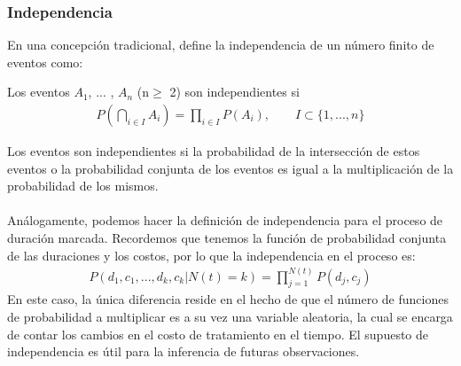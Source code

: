 \subsubsection{Independencia}
En una concepci\'on tradicional, \cite{resnickpath} define la independencia de un n\'umero finito de eventos como:\\
\begin{defi}
Los eventos $A_1$, ... , $A_n$ (n$\geq$ 2) son independientes si
\begin{align}
P(\bigcap_{i \in I} A_i) = \prod_{i \in I} P(A_i), \qquad I \subset\{1,...,n\} \nonumber
\end{align}
\end{defi}
Los eventos son independientes si la probabilidad de la intersecci\'on de estos eventos o la probabilidad conjunta de los eventos es igual a la multiplicaci\'on de la probabilidad de los mismos.\\
\\
An\'alogamente, podemos hacer la definici\'on de independencia para el proceso de duraci\'on marcada. Recordemos que tenemos la funci\'on de probabilidad conjunta de las duraciones y los costos, por lo que la independencia en el proceso es:
\begin{align}
P(d_1,c_1,...,d_k,c_k|N(t)=k)=\prod_{j=1}^{N(t)} P(d_j,c_j)
\end{align}
En este caso, la \'unica diferencia reside en el hecho de que el n\'umero de funciones de probabilidad a multiplicar es a su vez una variable aleatoria, la cual se encarga de contar los cambios en el costo de tratamiento en el tiempo. El supuesto de independencia es \'util para la inferencia de futuras observaciones.
